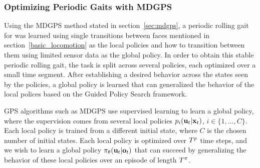 \subsubsection{Optimizing Periodic Gaits with MDGPS}
\label{sec:chains}

Using the MDGPS method stated in section~\ref{sec:mdgps}, a periodic rolling gait for \SB{} was learned using single transitions between faces mentioned in section~\ref{basic_locomotion} as the local policies and how to transition between them using limited sensor data as the global policy. 
In order to obtain this stable periodic rolling gait, the task is split across several policies, each optimized over a small time segment.
After establishing a desired behavior across the states seen by the policies, a global policy is learned that can generalized the behavior of the local polices based on the Guided Policy Search framework.


GPS algorithms such as MDGPS use supervised learning to learn a global policy,
where the supervision comes from several local policies $p_i(\mathbf{u}_t|\mathbf{x}_t)$,
$i\in\{1,\ldots,C\}$. Each local policy is trained from a different initial
state, where $C$ is the chosen number of initial states. Each local policy is
optimized over $T^{p}$ time steps, and we wish to learn a global policy
$\pi_{\theta}(\mathbf{u}_t|\mathbf{o}_t)$ that can succeed by generalizing the behavior of
these local policies over an episode of length $T^{\pi}$.

